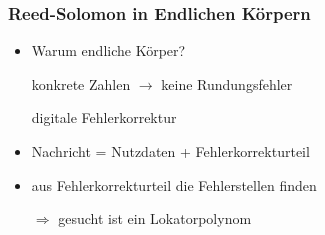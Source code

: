 \documentclass[11pt,aspectratio=169]{beamer}
\begin{document}
	\begin{frame}
		\frametitle{Reed-Solomon in Endlichen Körpern}
		
		\begin{itemize}
			\item Warum endliche Körper?
			
			\qquad konkrete Zahlen $\rightarrow$ keine Rundungsfehler
			
			\qquad digitale Fehlerkorrektur
			
			
			\vspace{10pt}
			
			\item Nachricht = Nutzdaten + Fehlerkorrekturteil
			
			\vspace{10pt}
			
			\item aus Fehlerkorrekturteil die Fehlerstellen finden
			
			\qquad $\Rightarrow$ gesucht ist ein Lokatorpolynom
			
			
			
						
		\end{itemize}
		
		
		
		
	\end{frame}
\end{document}
